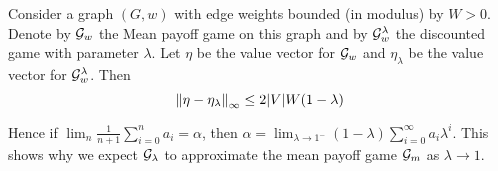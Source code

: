 \begin{theorem}
    \label{thm:mean-to-discounted}
    Consider a graph $(G,w)$ with edge weights bounded (in modulus) by $W > 0$. Denote by $\mathcal{G}_w$ the Mean payoff game on this graph and by $\mathcal{G}^\lambda_w$ the discounted game with parameter $\lambda$. Let $\eta$ be the value vector for $\mathcal{G}_w$ and $\eta_\lambda$ be the value vector for $\mathcal{G}^\lambda_w$. Then
    \[
        \left\lVert\eta - \eta_{\lambda}\right\rVert_\infty \leq 2|V|W (1-\lambda)
    \]

\end{theorem}

Hence if $\lim_n \frac{1}{n+1} \sum_{i=0}^n a_i = \alpha$, then $\alpha = \lim_{\lambda \to 1^-} (1-\lambda) \sum_{i=0}^\infty a_i \lambda^i$. This shows why we expect $\mathcal{G}_\lambda$ to approximate the mean payoff game $\mathcal{G}_m$ as $\lambda \to 1$.


